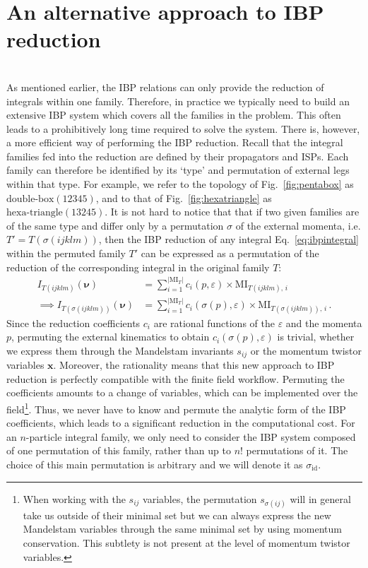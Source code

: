 \documentclass[main.tex]{subfiles}
\begin{document}
\section{An alternative approach to IBP reduction} \label{sec:altibps}
\\
As mentioned earlier, the IBP relations can only provide the reduction of integrals within one family. Therefore, in practice we typically need to build an extensive IBP system which covers all the families in the problem. This often leads to a prohibitively long time required to solve the system. There is, however, a more efficient way of performing the IBP reduction. Recall that the integral families fed into the reduction are defined by their propagators and ISPs. Each family can therefore be identified by its `type' and permutation of external legs within that type. For example, we refer to the topology of Fig.~\ref{fig:pentabox} as $\text{double-box}(12345)$, and to that of Fig.~\ref{fig:hexatriangle} as $\text{hexa-triangle}(13245)$. It is not hard to notice that that if two given families are of the same type and differ only by a permutation $\sigma$ of the external momenta, i.e. $T'=T(\sigma(ijklm))$, then the IBP reduction of any integral Eq.~\ref{eq:ibpintegral} within the permuted family $T'$ can be expressed as a permutation of the reduction of the corresponding integral in the original family $T$:
\begin{align}
    I_{T(ijklm)}(\bm{\nu}) &= \sum_{i=1}^{|\text{MI}_T|} c_i(p, \varepsilon) \times \text{MI}_{T(ijklm),\,i} \\
    \implies I_{T(\sigma(ijklm))}(\bm{\nu}) &= \sum_{i=1}^{|\text{MI}_T|} c_i(\sigma(p), \varepsilon) \times \text{MI}_{T(\sigma(ijklm)),\,i}\,.
\end{align}
  Since the reduction coefficients $c_i$ are rational functions of the $\varepsilon$ and the momenta $p$, permuting the external kinematics to obtain $c_i(\sigma(p), \varepsilon)$ is trivial, whether we express them through the Mandelstam invariants $s_{ij}$ or the momentum twistor variables $\bm{x}$. Moreover, the rationality means that this new approach to IBP reduction is perfectly compatible with the finite field workflow. Permuting the coefficients amounts to a change of variables, which can be implemented over the field\footnote{When working with the $s_{ij}$ variables, the permutation $s_{\sigma(ij)}$ will in general take us outside of their minimal set
but we can always express the new Mandelstam variables through the same minimal set by using momentum conservation. This subtlety is not present at the level of momentum twistor variables.}. Thus, we never have to know and permute the analytic form of the IBP coefficients, which leads to a significant reduction in the computational cost. For an $n$-particle integral family, we only need to consider the IBP system composed of one permutation of this family, rather than up to $n!$ permutations of it. The choice of this main permutation is arbitrary and we will denote it as $\sigma_\text{id}$.
\end{document}
